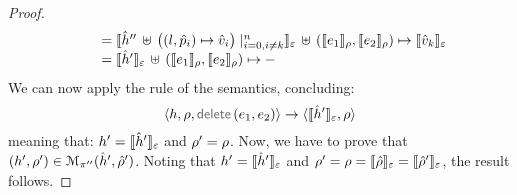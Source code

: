\begin{proof}
$$\begin{array}{l}
         \qquad =  \semexpr{\sheap'' \, \uplus \, \big((l, \sexprp_i) \mapsto \sexprv_i\big)\mid_{i = 0, i \neq k}^n}{\senv} \dunion (\symbeval{\jsilexpr_1}{\store}, \symbeval{\jsilexpr_2}{\store}) \mapsto \semexpr{\sexprv_k}{\senv} \\ 
         \qquad = \semexpr{\sheap'}{\senv} \dunion (\symbeval{\jsilexpr_1}{\store}, \symbeval{\jsilexpr_2}{\store}) \mapsto -
\end{array}
$$
We can now apply the  rule of the \jsil semantics, concluding: 
$$
   \semtrans{\heap, \store, \jsildelete(\jsilexpr_1, \jsilexpr_2)}{\semexpr{\sheap'}{\senv},  \store}
$$
meaning that: $\heap' = \semexpr{\sheap'}{\senv}$ and $\store' = \store$.
Now, we have to prove that $(\heap', \store') \in \smodels{\sheap', \sstore'}{\pc''}$.
Noting that $\heap' = \semexpr{\sheap'}{\senv}$ and $\store' = \store = \semexpr{\sstore}{\senv} = \semexpr{\sstore'}{\senv}$, 
the result follows. 
\vspace{6pt}


\end{proof}
